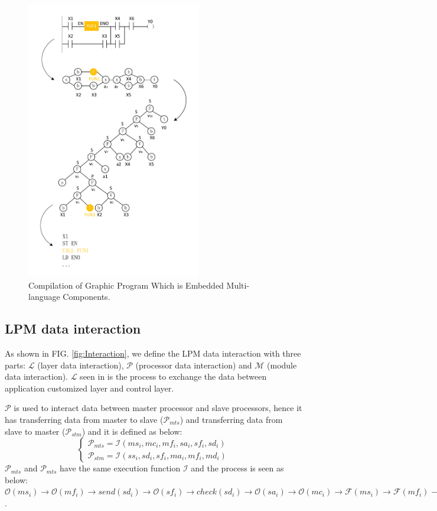 \documentclass[journal,UTF8]{IEEEtran}
\begin{document}
\begin{figure}
	\centering
	\includegraphics[width=3in]{fig/Compile.pdf}
	\caption{Compilation of Graphic Program Which is Embedded Multi-language Components.}
	\label{fig:Compile}
\end{figure}
 
 \subsection{LPM data interaction}
 As shown in FIG. \ref{fig:Interaction}, we define the LPM data interaction with three parts: $\mathcal{L}$ (layer data interaction), $\mathcal{P}$ (processor data interaction) and $\mathcal{M}$ (module data interaction). $\mathcal{L}$ seen in \cite{WuA} is the process to exchange the data between application customized layer and control layer.

$\mathcal{P}$ is used to interact data between master processor and slave processors, hence it has transferring data from master to slave ($\mathcal{P}_{mts}$) and transferring data from slave to master ($\mathcal{P}_{stm}$) and it is defined as below:
 \begin{equation}
 \left\{
 \begin{array}{l}
 \mathcal{P}_{mts} = \mathcal{I} (ms_i,mc_i,mf_i,sa_i,sf_i,sd_i)\\
 \mathcal{P}_{stm} = \mathcal{I} (ss_i,sd_i,sf_i,ma_i,mf_i,md_i)
 \end{array}
 \right.
 \end{equation}
 $\mathcal{P}_{mts}$ and $\mathcal{P}_{mts}$ have the same execution function $\mathcal{I}$ and the process is seen as below:
 $\mathcal{O}(ms_i)\to\mathcal{O}(mf_i)\to send(sd_i)\to\mathcal{O}(sf_i)\to check(sd_i)\to\mathcal{O}(sa_i)\to\mathcal{O}(mc_i)\to\mathcal{F}(ms_i)\to\mathcal{F}(mf_i)\to\mathcal{F}(mc_i)\to\mathcal{F}(sf_i)\to\mathcal{F}(sa_i)$.
 
\end{document}
